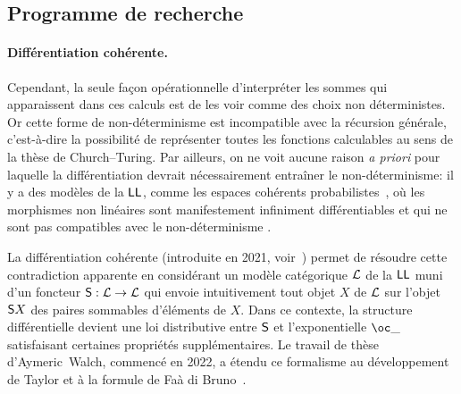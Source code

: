 \documentclass[a4]{article}
\begin{document}

\subsection*{Programme de recherche}

\paragraph*{Différentiation cohérente.}
Cependant, la seule façon opérationnelle d'interpréter les sommes qui
apparaissent dans ces calculs est de les voir comme des choix non
déterministes.
%
Or cette forme de non-déterminisme est incompatible avec la récursion
gé\-né\-ra\-le, c’est-à-dire la possibilité de représenter toutes les
fonctions calculables au sens de la thèse de Church--Turing.
%
%
Par ailleurs, on ne voit aucune raison \emph{a priori} pour laquelle la
différentiation devrait nécessairement entraîner le non-déterminisme:
%
il y a des modèles de la $\hbox{\textsf{LL}}$, comme les espaces cohérents
probabilistes~\cite{DanosEhrhard08}, où les morphismes non linéaires
sont manifestement infiniment différentiables et qui ne sont pas
compatibles avec le non-déterminisme%
% 
.

La différentiation cohérente (introduite en 2021,
voir~\cite{Ehrhard23a}) permet de résoudre cette contradiction
apparente en considérant un modèle catégorique $\mathcal{L}$ de la $\hbox{\textsf{LL}}$ muni
d'un foncteur ${\mathsf S}:\mathcal{L}\to\mathcal{L}$ qui envoie intuitivement tout objet
$X$ de $\mathcal{L}$ sur l'objet ${\mathsf S} X$ des paires sommables d'éléments de
$X$.
%
Dans ce contexte, la structure différentielle devient une loi
distributive entre ${\mathsf S}$ et l'exponentielle $\Oc\_$ satisfaisant
certaines propriétés supplémentaires.
%
Le travail de thèse d'Aymeric~Walch, commencé en 2022, a étendu ce
formalisme au développement de Taylor et à la formule de Faà di
Bruno~\cite{EhrhardWalch23b}.
\end{document}
